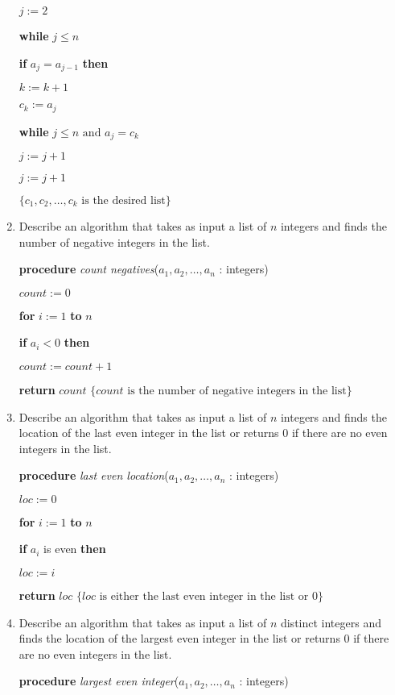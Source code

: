 \documentclass[11pt]{article}
\begin{document}
\begin{enumerate}[label=\textbf{\arabic*.}]
	$j := 2$
	
	\textbf{while} $j \leq n$

	\qquad \textbf{if} $a_j = a_{j - 1}$ \textbf{then}
	
	\qquad\qquad $k := k + 1$
	
	\qquad\qquad $c_k := a_j$
	
	\qquad\qquad \textbf{while} $j \leq n \text{ and } a_j = c_k$
	
	\qquad\qquad\qquad $j := j + 1$
	
	\qquad $j := j + 1$
	
	$\{ c_1, c_2, \ldots, c_k \text{ is the desired list} \}$
	
	\item Describe an algorithm that takes as input a list of $n$ integers and finds the number of negative integers in the list.
	
	\textbf{procedure} \emph{count negatives}($a_1, a_2, \ldots, a_n$ : integers)
	
	$count := 0$
	
	\textbf{for} $i := 1$ \textbf{to} $n$
	
	\qquad \textbf{if} $a_i < 0$ \textbf{then}
	
	\qquad\qquad $count := count + 1$
	
	\textbf{return} $count$ $\{ count \text{ is the number of negative integers in the list}\}$
	
	\item Describe an algorithm that takes as input a list of $n$ integers and finds the location of the last even integer in the list or returns 0 if there are no even integers in the list.
	
	\textbf{procedure} \emph{last even location}($a_1, a_2, \ldots, a_n$ : integers)
	
	$loc := 0$
	
	\textbf{for} $i := 1$ \textbf{to} $n$
	
	\qquad \textbf{if} $a_i$ is even \textbf{then}
	
	\qquad\qquad $loc := i$
	
	\textbf{return} $loc$ $\{ loc \text{ is either the last even integer in the list or 0} \}$
	
	\item Describe an algorithm that takes as input a list of $n$ distinct integers and finds the location of the largest even integer in the list or returns 0 if there are no even integers in the list.
	
	\textbf{procedure} \emph{largest even integer}($a_1, a_2, \ldots, a_n$ : integers)
	

\end{enumerate}
\end{document}
